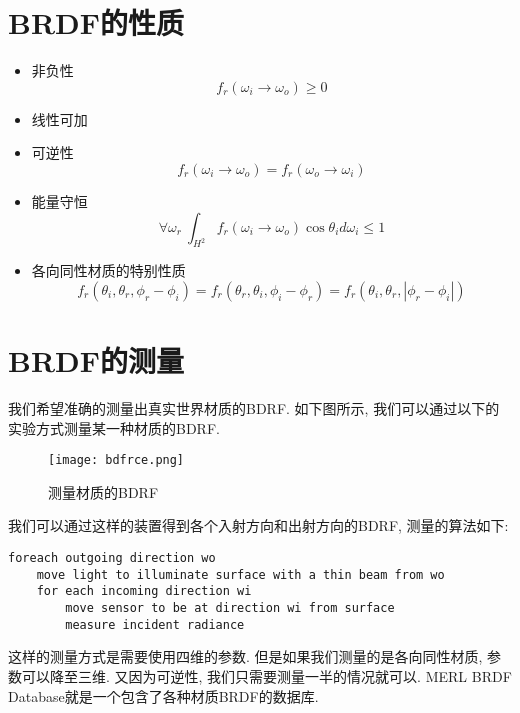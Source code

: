 \section{BRDF的性质}
\begin{itemize}
	\item 非负性
	\begin{equation}
		f_r(\omega_i\rightarrow \omega_o) \geq 0
	\end{equation}
	\item 线性可加
	\item 可逆性
	\begin{equation}
		f_r(\omega_i\rightarrow \omega_o)=f_r(\omega_o\rightarrow \omega_i)
	\end{equation}
	\item 能量守恒
	\begin{equation}
		\forall\omega_r\ \int_{H^2}f_r(\omega_i\rightarrow \omega_o)\cos\theta_id\omega_i\leq 1
	\end{equation}
	\item 各向同性材质的特别性质
	\begin{equation}
		f_r(\theta_i,\theta_r,\phi_r-\phi_i)=f_r(\theta_r,\theta_i,\phi_i-\phi_r)=f_r(\theta_i,\theta_r,|\phi_r-\phi_i|)
	\end{equation}
\end{itemize}

\section{BRDF的测量}

我们希望准确的测量出真实世界材质的BDRF. 如下图所示, 我们可以通过以下的实验方式测量某一种材质的BDRF. 

\begin{figure}[H]
	\centering
	\texttt{[image: bdfrce.png]}
	\caption{测量材质的BDRF}
	\label{fig:bdrfce}
\end{figure}

我们可以通过这样的装置得到各个入射方向和出射方向的BDRF, 测量的算法如下: 
\begin{lstlisting}[caption=BDRF的测量]
foreach outgoing direction wo
	move light to illuminate surface with a thin beam from wo
	for each incoming direction wi
		move sensor to be at direction wi from surface
		measure incident radiance
\end{lstlisting}

这样的测量方式是需要使用四维的参数. 但是如果我们测量的是各向同性材质, 参数可以降至三维. 又因为可逆性, 我们只需要测量一半的情况就可以. MERL BRDF Database就是一个包含了各种材质BRDF的数据库. 

